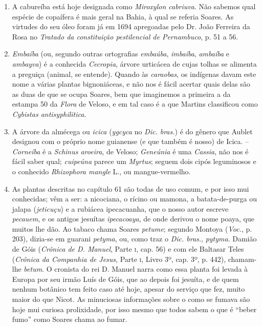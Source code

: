 \begin{enumerate}
\item A cabureíba está hoje designada como \textit{Miroxylon cabriuva}. Não sabemos qual 
espécie de copaífera é mais geral na Bahia, à qual se referia Soares. As virtudes do seu 
óleo foram já em 1694 apregoadas pelo Dr. João Ferreira da Rosa no \textit{Tratado da constituição pestilencial de Pernambuco}, p. 51 a 56.

\item \textit{Embaíba} (ou, segundo outras ortografias \textit{embaúba}, \textit{imbaíba}, \textit{ambaíba} e \textit{ambayva}) 
é a conhecida \textit{Cecropia}, árvore urticácea de cujas tolhas se alimenta a preguiça 
(animal, se entende). Quando às \textit{caraobas}, os indígenas davam este nome a várias 
plantas bignoniáceas, e não nos é fácil acertar quais delas são as duas de que se ocupa 
Soares, bem que imaginemos a primeira a da estampa 50 da \textit{Flora} de Veloso, e em tal 
caso é a que Martins classificou como \textit{Cybistas antisyphilitica}.

\item A árvore da almécega ou \textit{icica} (\textit{ygcyca} no \textit{Dic. bras.}) é do gênero que Aublet 
designou com o próprio nome guianense (e que também é nosso) de Icica. -- \textit{Corneíba} 
é a \textit{Schinus aroeira}, de Veloso; \textit{Geneúnia} é uma \textit{Cassia}, não nos é fácil saber qual; 
\textit{cuipeúna} parece um \textit{Myrtus}; seguem dois cipós leguminosos e  o  conhecido  
\textit{Rhizophora mangle} L., ou mangue-vermelho.

\item  As plantas descritas no capítulo 61 são todas de uso comum, e por isso mui 
conhecidas; vêm a ser: a nicociana, o rícino ou mamona, a batata-de-purga ou jalapa 
(\textit{jeticuçu}) e a rubiácea ipecacuanha, que o nosso autor escreve \textit{pecauem}, e os antigos jesuítas  
\textit{ipecacoaya}, de onde derivou o nome poaya,  que muitos lhe dão. Ao tabaco chama Soares  \textit{petume}; segundo 
Montoya (\textit{Voc.}, p. 203), dizia-se em guarani \textit{petyma},  ou, como traz o \textit{Dic. 
bras.}, \textit{pytyma}. Damião de Góis (\textit{Crônica de D. Manuel}, Parte \textsc{i}, cap. 56) e com ele Baltasar 
Teles (\textit{Crônica da Companhia de Jesus}, Parte \textsc{i}, Livro 3º, cap. 3º, p. 442), chamam-lhe \textit{betum}.  
O cronista do rei D. Manuel narra como essa planta foi levada à Europa por seu 
irmão Luís de Góis, que ao depois foi jesuíta, e de quem nenhum botânico tem feito caso até 
hoje, apesar do serviço que fez, muito maior do que Nicot. As minuciosas informações sobre 
o como se fumava são hoje mui curiosa prolixidade, por isso mesmo que todos sabem o que 
é ``beber fumo'' como Soares chama ao fumar.


\end{enumerate}
